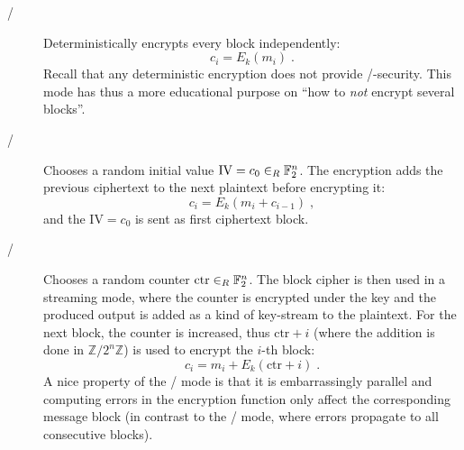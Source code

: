 \begin{description}
    \item[\ECB/] Deterministically encrypts every block independently:
                 \begin{equation*}
                     c_i = E_k(m_i)\;.
                 \end{equation*}
                 Recall that any deterministic encryption does not provide \CPA/-security.
                 This mode has thus a more educational purpose on \enquote{how to \emph{not} encrypt several blocks}.
    \item[\CBC/] Chooses a random initial value $\mathrm{IV} = c_0 \in_R \mathbb{F}_2^n$.
                 The encryption adds the previous ciphertext to the next plaintext before encrypting it:
                 \begin{equation*}
                     c_i = E_k(m_i + c_{i-1})\;,
                 \end{equation*}
                 and the $\mathrm{IV} = c_0$ is sent as first ciphertext block.
    \item[\CTR/] Chooses a random counter $\mathrm{ctr} \in_R \mathbb{F}_2^n$.
                 The block cipher is then used in a streaming mode, where the counter is encrypted under the key and the produced output is added as a kind of key-stream to the plaintext.
                 For the next block, the counter is increased, thus $\mathrm{ctr}+i$ (where the addition is done in $\mathbb{Z}/2^n\mathbb{Z}$) is used to encrypt the $i$-th block:
                 \begin{equation*}
                     c_i = m_i + E_k(\mathrm{ctr}+i)\;.
                 \end{equation*}
                 A nice property of the \CTR/ mode is that it is embarrassingly parallel and computing errors in the encryption function only affect the corresponding message block (in contrast to the \CBC/ mode, where errors propagate to all consecutive blocks).
\end{description}
